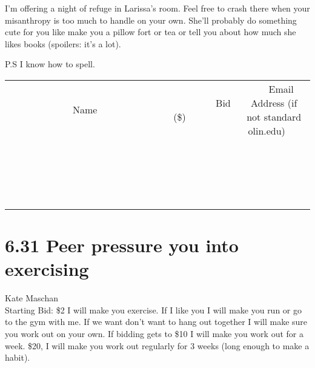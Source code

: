 \documentclass[11pt]{article}
\begin{document}
I'm offering a night of refuge in Larissa's room. Feel free to crash there when your misanthropy is too much to handle on your own. She'll probably do something cute for you like make you a pillow fort or tea or tell you about how much she likes books (spoilers: it's a lot).

P.S I know how to spell.
\\[3ex]
\begin{tabular}{c c c}
~~~~~~~~~~~~~Name~~~~~~~~~~~~~ & ~~~~~~~~~Bid (\$)~~~~~~~~~  & ~~~Email Address (if not standard olin.edu)~~~\\
 & & \\
\hline
 & & \\
\hline
 & & \\
\hline
 & & \\
\hline
 & & \\
\hline
 & & \\
\hline
 & & \\
\hline
 & & \\
\hline
 & & \\
\hline
 & & \\
\hline
 & & \\
\hline
 & & \\
\hline
 & & \\
\hline
 & & \\
\hline
 & & \\
\hline
 & & \\
\hline
 & & \\
\hline
 & & \\
\hline
 & & \\
\hline
\end{tabular}
\newpage
\section*{6.31 Peer pressure you into exercising}
Kate Maschan
\\
Starting Bid: \$2
\newline
I will make you exercise. If I like you I will make you run or go to the gym with me. If we want don't want to hang out together I will make sure you work out on your own.
If bidding gets to \$10 I will make you work out for a week.
\$20, I will make you work out regularly for 3 weeks (long enough to make a habit).
\end{document}
